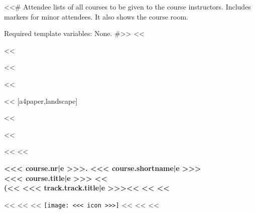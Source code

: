 <<# Attendee lists of all courses to be given to the course instructors. Includes markers for minor attendees. It also
    shows the course room.

    Required template variables: None.
#>>
<<%

<<%

<<%
    \usepackage{pgfpages}
<<%

<<%
    \geometry{top=1cm,bottom=1cm,left=1cm,right=1cm}
    [a4paper,landscape] %

    \ifoot[]{}
    \ihead[]{}
    \cfoot[]{}
    \ofoot[]{}
<<%

<<%

<<%
    <<%

        \begin{minipage}[t]{\textwidth-2.5cm}%
            \vspace{0pt}
            \raggedright
            \headingfamily\bfseries\Large{}<<< course.nr|e >>>. <<< course.shortname|e >>>\\
            \normalsize{}<<< course.title|e >>>
            <<%
                \\
                (<<%
                    <<< track.track.title|e >>><<%
                <<%
            <<%
        \end{minipage}%
        \hspace{0.5cm}%
        \begin{minipage}[t][2cm][t]{2cm}
            \vspace{0pt}
            <<%
                <<%
                    <<%
                        \texttt{[image: <<< icon >>>]}%
                    <<%
                <<%
            <<%
        \end{minipage}

